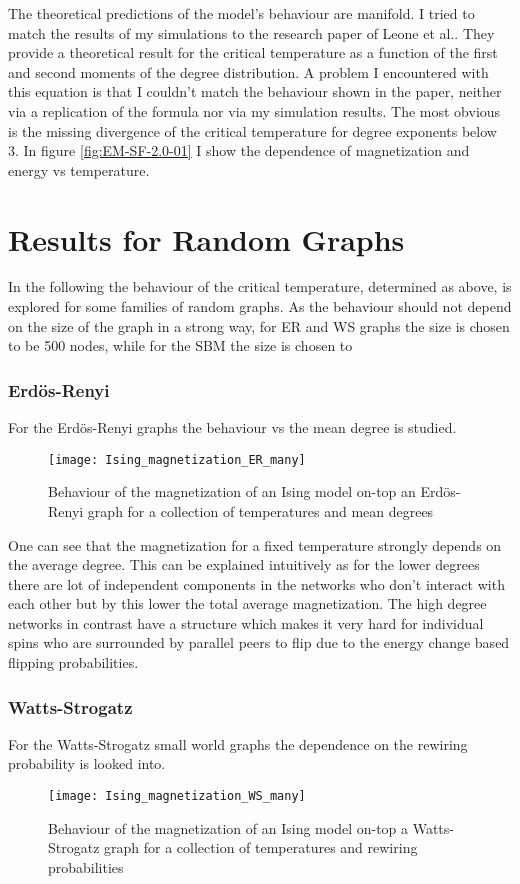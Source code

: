 The theoretical predictions of the model's behaviour are manifold.
I tried to match the results of my simulations to the research paper of Leone et al.\cite{Leone2002}.
They provide a theoretical result for the critical temperature as a function of the first and second moments of the degree distribution.
A problem I encountered with this equation is that I couldn't match the behaviour shown in the paper, neither via a replication of the formula nor via my simulation results.
The most obvious is the missing divergence of the critical temperature for degree exponents below 3.
In figure \ref{fig:EM-SF-2.0-01} I show the dependence of magnetization and energy vs temperature.

\section{Results for Random Graphs}
In the following the behaviour of the critical temperature, determined as above, is explored for some families of random graphs. As the behaviour should not depend on the size of the graph in a strong way, for ER and WS graphs the size is chosen to be 500 nodes, while for the SBM the size is chosen to 
\subsubsection{Erdös-Renyi}
For the Erdös-Renyi graphs the behaviour vs the mean degree is studied.
\begin{figure}[h]
	\centering
	\texttt{[image: Ising\_magnetization\_ER\_many]}
	\caption{Behaviour of the magnetization of an Ising model on-top an Erdös-Renyi graph for a collection of temperatures and mean degrees}
	\label{fig:M-ER-0.1}
\end{figure}
One can see that the magnetization for a fixed temperature strongly depends on the average degree.
This can be explained intuitively as for the lower degrees there are lot of independent components in the networks who don't interact with each other but by this lower the total average magnetization.
The high degree networks in contrast have a structure which makes it very hard for individual spins who are surrounded by parallel peers to flip due to the energy change based flipping probabilities.


\subsubsection{Watts-Strogatz}
For the Watts-Strogatz small world graphs the dependence on the rewiring probability is looked into.
\begin{figure}[h]
	\centering
	\texttt{[image: Ising\_magnetization\_WS\_many]}
	\caption{Behaviour of the magnetization of an Ising model on-top a Watts-Strogatz graph for a collection of temperatures and rewiring probabilities}
	\label{fig:M-WS-0.1}
\end{figure}

